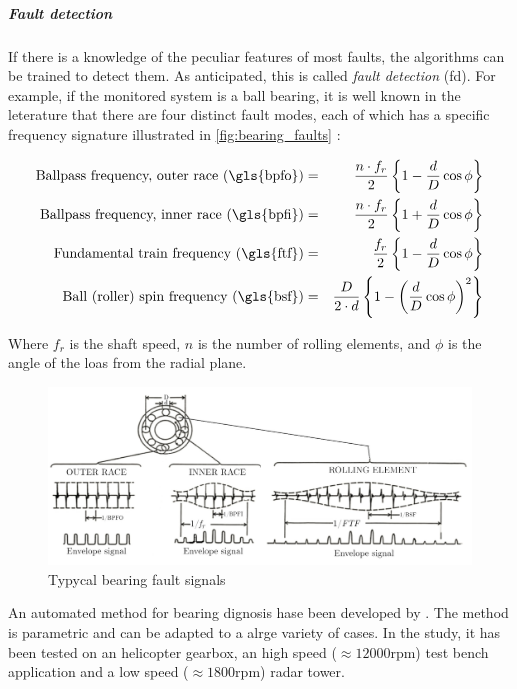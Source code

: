 \subparagraph*{Fault detection}
If there is a knowledge of the peculiar features of most faults, the algorithms can be trained to detect them. As anticipated, this is called \emph{fault detection} (\gls{fd}). For example, if the monitored system is a ball bearing, it is well known in the leterature that there are four distinct fault modes, each of which has a specific frequency signature illustrated in \autoref{fig:bearing_faults} \cite{RollingSignature}:

\begin{eqnarray*}
    \text{Ballpass frequency, outer race (\gls{bpfo})}&=& \frac{n\cdot f_r}{2}\left\{1-\frac{d}{D} \cos \phi \right\}\\
    \text{Ballpass frequency, inner race (\gls{bpfi})}&=& \frac{n\cdot f_r}{2}\left\{1+\frac{d}{D} \cos \phi \right\}\\
    \text{Fundamental train frequency (\gls{ftf})}&=& \frac{f_r}{2}\left\{1-\frac{d}{D} \cos \phi \right\}\\
    \text{Ball (roller) spin frequency (\gls{bsf})}&=& \frac{D}{2\cdot d}\left\{1-\left(\frac{d}{D} \cos \phi \right)^2\right\}
\end{eqnarray*}

Where $f_r$ is the shaft speed, $n$ is the number of rolling elements, and $\phi$ is the angle of the loas from the radial plane. 

\begin{figure}
    \centering
    \includegraphics[width=\textwidth]{images/StateArt/bearing.jpg}
    \caption{Typycal bearing fault signals \cite{RollingSignature}}
    \label{fig:bearing_faults}
\end{figure}

An automated method for bearing dignosis hase been developed by \cite{sawalhi2008semi}. The method is parametric and can be adapted to a alrge variety of cases. In the study, it has been tested on an helicopter gearbox, an high speed ($\approx 12000$rpm) test bench application and a low speed ($\approx 1800$rpm) radar tower. 

